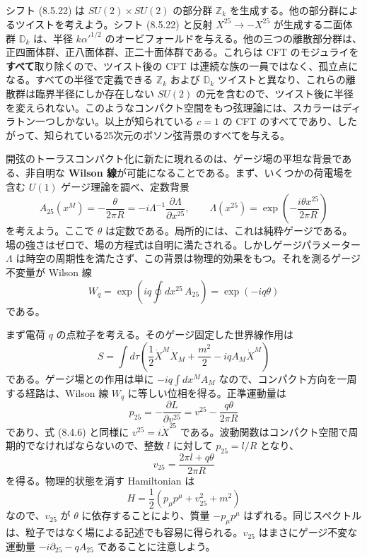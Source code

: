 シフト (8.5.22) は $SU(2)\times SU(2)$ の部分群 $\mathbb Z_k$ を生成する。他の部分群によるツイストを考えよう。シフト (8.5.22) と反射 $X^{25}\to-X^{25}$ が生成する二面体群 $\mathbb D_k$ は、半径 $k\alpha'^{1/2}$ のオービフォールドを与える。他の三つの離散部分群は、正四面体群、正八面体群、正二十面体群である。これらは CFT のモジュライを\textbf{すべて}取り除くので、ツイスト後の CFT は連続な族の一員ではなく、孤立点になる。すべての半径で定義できる $\mathbb Z_k$ および $\mathbb D_k$ ツイストと異なり、これらの離散群は臨界半径にしか存在しない $SU(2)$ の元を含むので、ツイスト後に半径を変えられない。このようなコンパクト空間をもつ弦理論には、スカラーはディラトン一つしかない。以上が知られている $c=1$ の CFT のすべてであり、したがって、知られている25次元のボソン弦背景のすべてを与える。

\label{sec:8.6}

開弦のトーラスコンパクト化に新たに現れるのは、ゲージ場の平坦な背景である、非自明な \textbf{Wilson 線}が可能になることである。まず、いくつかの荷電場を含む $U(1)$ ゲージ理論を調べ、定数背景
\begin{equation}
A_{25}(x^M)=-\frac{\theta}{2\pi R}
=-i\Lambda^{-1}\frac{\partial\Lambda}{\partial x^{25}},
\qquad
\Lambda(x^{25})=\exp\left(-\frac{i\theta x^{25}}{2\pi R}\right)
\tag{8.6.1}\label{eq:8.6.1}
\end{equation}
を考えよう。ここで $\theta$ は定数である。局所的には、これは純粋ゲージである。場の強さはゼロで、場の方程式は自明に満たされる。しかしゲージパラメーター $\Lambda$ は時空の周期性を満たさず、この背景は物理的効果をもつ。それを測るゲージ不変量が Wilson 線
\begin{equation}
W_q=\exp\left(iq\oint dx^{25}\,A_{25}\right)
=\exp(-iq\theta)
\tag{8.6.2}\label{eq:8.6.2}
\end{equation}
である。

まず電荷 $q$ の点粒子を考える。そのゲージ固定した世界線作用は
\begin{equation}
S=\int d\tau\left(\frac12\dot X^M\dot X_M
+\frac{m^2}{2}-iqA_M\dot X^M\right)
\tag{8.6.3}\label{eq:8.6.3}
\end{equation}
である。ゲージ場との作用は単に $-iq\int dx^M A_M$ なので、コンパクト方向を一周する経路は、Wilson 線 $W_q$ に等しい位相を得る。正準運動量は
\begin{equation}
p_{25}=-\frac{\partial L}{\partial v^{25}}
=v^{25}-\frac{q\theta}{2\pi R}
\tag{8.6.4}\label{eq:8.6.4}
\end{equation}
であり、式 (8.4.6) と同様に $v^{25}=i\dot X^{25}$ である。波動関数はコンパクト空間で周期的でなければならないので、整数 $l$ に対して $p_{25}=l/R$ となり、
\begin{equation}
v_{25}=\frac{2\pi l+q\theta}{2\pi R}
\tag{8.6.5}\label{eq:8.6.5}
\end{equation}
を得る。物理的状態を消す Hamiltonian は
\begin{equation}
H=\frac12\left(p_\mu p^\mu+v_{25}^2+m^2\right)
\tag{8.6.6}\label{eq:8.6.6}
\end{equation}
なので、$v_{25}$ が $\theta$ に依存することにより、質量 $-p_\mu p^\mu$ はずれる。同じスペクトルは、粒子ではなく場による記述でも容易に得られる。$v_{25}$ はまさにゲージ不変な運動量 $-i\partial_{25}-qA_{25}$ であることに注意しよう。

